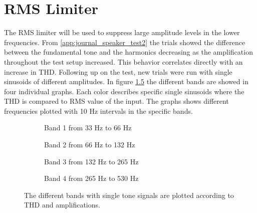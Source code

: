 \chapter{RMS Limiter}\label{cha:CompressorDesign}
The RMS limiter will be used to suppress large amplitude levels in the lower frequencies. From \autoref{app:journal_speaker_test2} the trials showed the difference between the fundamental tone and the harmonics decreasing as the amplification throughout the test setup increased. This behavior correlates directly with an increase in THD. Following up on the test, new trials were run with single sinusoids of different amplitudes. In figure \ref{fig:THDComparissonRMS} the different bands are showed in four individual graphs. Each color describes specific single sinusoids where the THD is compared to RMS value of the input. The graphs shows different frequencies plotted with 10 Hz intervals in the specific bands.

\begin{figure}[H]
	\centering
	\begin{subfigure}[t]{0.45\textwidth}
		\centering
		
		\caption{Band 1 from 33 Hz to 66 Hz}
		\label{fig:Band1ModelRMS}
	\end{subfigure}
	\begin{subfigure}[t]{0.45\textwidth}
		\centering
		
		\caption{Band 2 from 66 Hz to 132 Hz}
		\label{fig:Band2ModelRMS}
	\end{subfigure}
	\begin{subfigure}[t]{0.45\textwidth}
		\centering
		
		\caption{Band 3 from 132 Hz to 265 Hz}
		\label{fig:Band3ModelRMS}
	\end{subfigure}
	\begin{subfigure}[t]{0.45\textwidth}
		\centering
		
		\caption{Band 4 from 265 Hz to 530 Hz}
		\label{fig:Band4ModelRMS}
	\end{subfigure}
	\caption{The different bands with single tone signals are plotted according to THD and amplifications.}
	\label{fig:THDComparissonRMS}
\end{figure} 

